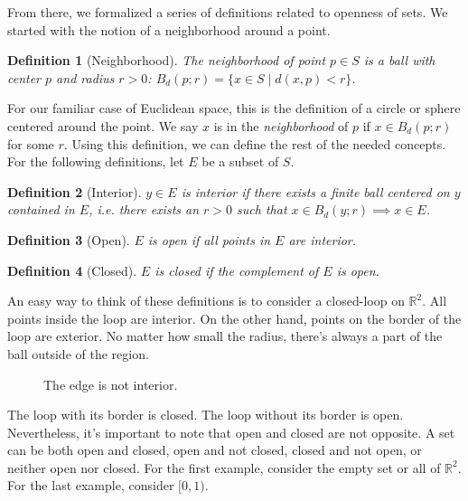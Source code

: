 \documentclass{article}
\newtheorem*{defn}{Definition}
\begin{document}
From there, we formalized a series of definitions related to openness of sets.
We started with the notion of a neighborhood around a point.

\begin{defn}[Neighborhood]
The neighborhood of point $p \in S$ is a ball with center $p$ and radius $r > 0$:
$B_d(p; r) = \{x \in S \mid d(x, p) < r\}$.
\end{defn}

For our familiar case of Euclidean space, this is the definition of a circle or
sphere centered around the point. We say $x$ is in the \textit{neighborhood} of
$p$ if $x \in B_d(p; r)$ for some $r$. Using this definition, we can define the
rest of the needed concepts. For the following definitions, let $E$ be a subset
of $S$.

\begin{defn}[Interior] 
$y\in E$ is interior if there exists a finite ball centered on $y$ contained in
    $E$, i.e. there exists an $r>0$ such that $x \in B_d(y; r) \implies x \in E$.
\end{defn}

\begin{defn}[Open] 
$E$ is open if all points in $E$ are interior.
\end{defn}

\begin{defn}[Closed] 
$E$ is closed if the complement of $E$ is open.
\end{defn}

An easy way to think of these definitions is to consider a closed-loop on
$\mathbb{R}^2$. All points inside the loop are interior. On the other hand, points on
the border of the loop are exterior. No matter how small the radius, there's
always a part of the ball outside of the region.

\begin{figure}[!htb]
    \caption{\label{fig:edge} The edge is not interior. }
\end{figure}

The loop with its border is closed. The loop without its border is open.
Nevertheless, it's important to note that open and closed are not opposite. A
set can be both open and closed, open and not closed, closed and not open, or
neither open nor closed. For the first example, consider the empty set or all
of $\mathbb{R}^2$. For the last example, consider $[0, 1)$.
\end{document}
